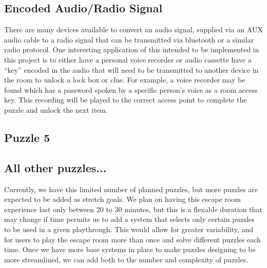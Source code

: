 \documentclass[conference]{IEEEtran}
\begin{document}
\subsection{Encoded Audio/Radio Signal}
There are many devices available to convert an audio signal, supplied via an AUX audio cable
to a radio signal that can be transmitted via bluetooth or a similar radio protocol. One interesting
application of this intended to be implemented in this project is to either have a personal voice recorder
or audio cassette have a ``key'' encoded in the audio that will need to be transmitted to another
device in the room to unlock a lock box or clue. For example, a voice recorder may be found which has
a password spoken by a specific person's voice as a room access key. This recording will be played
to the correct access point to complete the puzzle and unlock the next item.

\subsection{Puzzle 5}

\subsection{All other puzzles...}
Currently, we have this limited number of planned puzzles, but more puzzles are expected to be added
as stretch goals. We plan on having this escape room experience last only between 20 to 30 minutes,
but this is a flexable duration that may change if time permits us to add a system that selects
only certain puzzles to be used in a given playthrough. This would allow for greater variability,
and for users to play the escape room more than once and solve different puzzles each time.
Once we have more base systems in place to make puzzles designing to be more streamlined, we can add
both to the number and complexity of puzzles.
\end{document}

